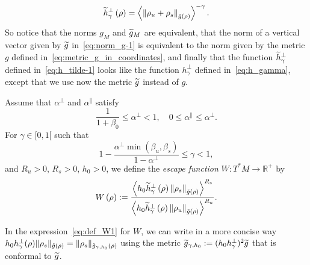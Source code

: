 \documentclass[AHL,Unicode,longabstracts,published]{cedram}
\newcommand{\bbR}{\mathbb{R}}
\let\oldtilde\tilde
\renewcommand*{\tilde}[1]{\mathchoice{\widetilde{#1}}{\widetilde{#1}}{\oldtilde{#1}}{\oldtilde{#1}}}
\newcommand{\bbR}{\mathbb{R}}
\begin{document}
\begin{equation}\label{eq:h_tilde-1}
\tilde{h}_{\gamma}^{\perp}\left(\rho\right)=\left\langle \left\Vert \rho_{u}+\rho_{s}\right\Vert _{\tilde{g}\left(\rho\right)}\right\rangle ^{-\gamma}.
\end{equation}
So notice that the norms $g_{M}$ and $\tilde{g}_{M}$ are equivalent, that the norm of a vertical vector given by $\tilde{g}$ in~\eqref{eq:norm_g-1} is equivalent to the norm given by the metric $g$ defined in~\eqref{eq:metric_g_in_coordinates}, and finally that the function $\tilde{h}_{\gamma}^{\perp}$ defined in~\eqref{eq:h_tilde-1} looks like the function $h_{\gamma}^{\perp}$ defined in~\eqref{eq:h_gamma}, except that we use now the metric $\tilde{g}$ instead of $g$.

\begin{cBoxA}{}
\begin{defi}\label{def:def_W1}
Assume that $\alpha^{\perp}$ and $\alpha^{\parallel}$ satisfy
\begin{equation}\label{eq:ineq1}
\frac{1}{1+\beta_{0}}\leq\alpha^{\perp}<1,\quad0\leq\alpha^{\parallel}\leq\alpha^{\perp}.
\end{equation}
For $\gamma\in[0,1[$ such that
\begin{equation}\label{eq:gamma_interval}
1-\frac{\alpha^{\perp}\min\left(\beta_{u},\beta_{s}\right)}{1-\alpha^{\perp}}\leq\gamma<1,
\end{equation}
and $R_{u}>0$, $R_{s}>0$, $h_{0}>0$, we define the \emph{escape function} $W:T^{*}M\rightarrow\bbR^{+}$ by
\begin{equation}\label{eq:def_W1}
W\left(\rho\right):=\frac{\left\langle h_{0}\tilde{h}_{\gamma}^{\perp}\left(\rho\right)\left\Vert \rho_{s}\right\Vert _{\tilde{g}\left(\rho\right)}\right\rangle ^{R_{s}}}{\left\langle h_{0}\tilde{h}_{\gamma}^{\perp}\left(\rho\right)\left\Vert \rho_{u}\right\Vert _{\tilde{g}\left(\rho\right)}\right\rangle ^{R_{u}}}.
\end{equation}
\end{defi}
\end{cBoxA}

\begin{rema}
In the expression~\eqref{eq:def_W1} for $W$, we can write in a more concise way $h_{0}h_{\gamma}^{\perp}(\rho)\Vert \rho_{s}\Vert _{\tilde{g}(\rho)}=\Vert \rho_{s}\Vert _{\tilde{g}_{\gamma,h_{0}}(\rho)}$ using the metric $\tilde{g}_{\gamma,h_{0}}:=(h_{0}h_{\gamma}^{\perp})^{2}\tilde{g}$ that is conformal to $\tilde{g}$.
\end{rema}
\end{document}
